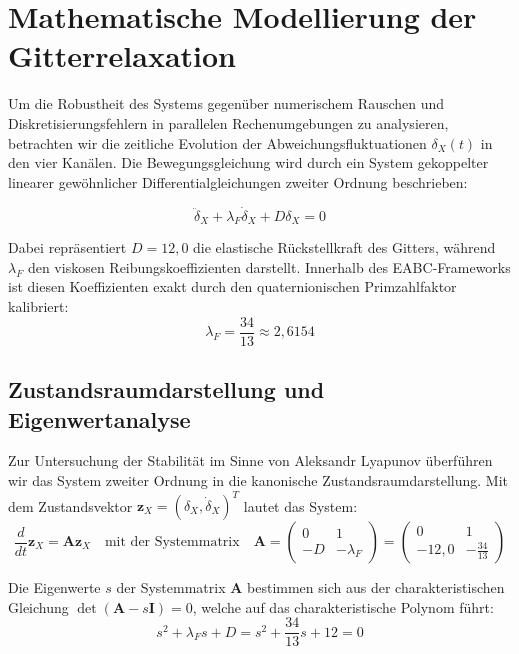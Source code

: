 \documentclass[11pt,a4paper]{article}
\begin{document}
	\section{Mathematische Modellierung der Gitterrelaxation}
	
	Um die Robustheit des Systems gegenüber numerischem Rauschen und Diskretisierungsfehlern in parallelen Rechenumgebungen zu analysieren, betrachten wir die zeitliche Evolution der Abweichungsfluktuationen $\delta_X(t)$ in den vier Kanälen. Die Bewegungsgleichung wird durch ein System gekoppelter linearer gewöhnlicher Differentialgleichungen zweiter Ordnung beschrieben:
	
	\begin{equation}
		\ddot{\delta}_X + \lambda_F \dot{\delta}_X + D \delta_X = 0
	\end{equation}
	
	Dabei repräsentiert $D = 12{,}0$ die elastische Rückstellkraft des Gitters, während $\lambda_F$ den viskosen Reibungskoeffizienten darstellt. Innerhalb des EABC-Frameworks ist diesen Koeffizienten exakt durch den quaternionischen Primzahlfaktor kalibriert:
	\begin{equation}
		\lambda_F = \frac{34}{13} \approx 2{,}6154
	\end{equation}
	
	\subsection{Zustandsraumdarstellung und Eigenwertanalyse}
	Zur Untersuchung der Stabilität im Sinne von Aleksandr Lyapunov überführen wir das System zweiter Ordnung in die kanonische Zustandsraumdarstellung. Mit dem Zustandsvektor $\mathbf{z}_X = (\delta_X, \dot{\delta}_X)^T$ lautet das System:
	\begin{equation}
		\frac{d}{dt} \mathbf{z}_X = \mathbf{A} \mathbf{z}_X 
		\quad \text{mit der Systemmatrix} \quad
		\mathbf{A} = \begin{pmatrix} 0 & 1 \\ -D & -\lambda_F \end{pmatrix} = \begin{pmatrix} 0 & 1 \\ -12{,}0 & -\frac{34}{13} \end{pmatrix}
	\end{equation}
	
	Die Eigenwerte $s$ der Systemmatrix $\mathbf{A}$ bestimmen sich aus der charakteristischen Gleichung $\det(\mathbf{A} - s\mathbf{I}) = 0$, welche auf das charakteristische Polynom führt:
	\begin{equation}
		s^2 + \lambda_F s + D = s^2 + \frac{34}{13}s + 12 = 0
	\end{equation}
	
\end{document}
